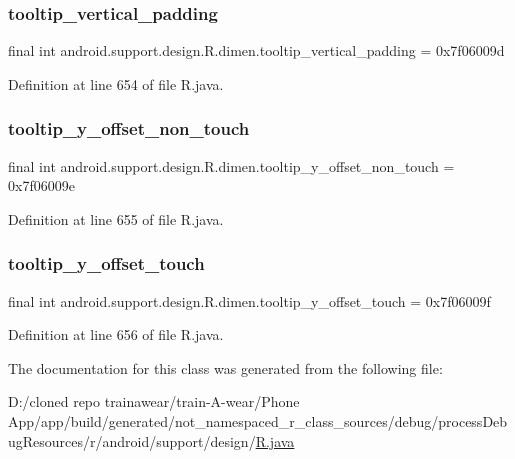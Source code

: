 \subsubsection{\texorpdfstring{tooltip\_vertical\_padding}{tooltip\_vertical\_padding}}
{\footnotesize\ttfamily final int android.\+support.\+design.\+R.\+dimen.\+tooltip\+\_\+vertical\+\_\+padding = 0x7f06009d\hspace{0.3cm}{\ttfamily [static]}}



Definition at line 654 of file R.\+java.

\mbox{\label{classandroid_1_1support_1_1design_1_1_r_1_1dimen_a4240fd5708c2da5d2eb045a23cf0b2a7}} 
\subsubsection{\texorpdfstring{tooltip\_y\_offset\_non\_touch}{tooltip\_y\_offset\_non\_touch}}
{\footnotesize\ttfamily final int android.\+support.\+design.\+R.\+dimen.\+tooltip\+\_\+y\+\_\+offset\+\_\+non\+\_\+touch = 0x7f06009e\hspace{0.3cm}{\ttfamily [static]}}



Definition at line 655 of file R.\+java.

\mbox{\label{classandroid_1_1support_1_1design_1_1_r_1_1dimen_a7e9207470a7236ed6fade4180fc9eeab}} 
\subsubsection{\texorpdfstring{tooltip\_y\_offset\_touch}{tooltip\_y\_offset\_touch}}
{\footnotesize\ttfamily final int android.\+support.\+design.\+R.\+dimen.\+tooltip\+\_\+y\+\_\+offset\+\_\+touch = 0x7f06009f\hspace{0.3cm}{\ttfamily [static]}}



Definition at line 656 of file R.\+java.



The documentation for this class was generated from the following file\+:\begin{DoxyCompactItemize}
\item 
D\+:/cloned repo trainawear/train-\/\+A-\/wear/\+Phone App/app/build/generated/not\+\_\+namespaced\+\_\+r\+\_\+class\+\_\+sources/debug/process\+Debug\+Resources/r/android/support/design/\mbox{\hyperlink{process_debug_resources_2r_2android_2support_2design_2_r_8java}{R.\+java}}\end{DoxyCompactItemize}

